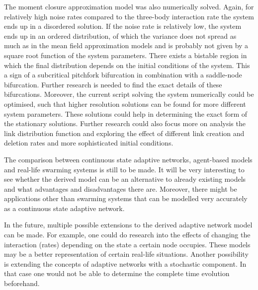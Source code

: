 The moment closure approximation model was also numerically solved. Again, for relatively high noise rates compared to the three-body interaction rate the system ends up in a disordered solution. If the noise rate is relatively low, the system ends up in an ordered distribution, of which the variance does not spread as much as in the mean field approximation models and is probably not given by a square root function of the system parameters. There exists a bistable region in which the final distribution depends on the initial conditions of the system. This a sign of a subcritical pitchfork bifurcation in combination with a saddle-node bifurcation. Further research is needed to find the exact details of these bifurcations. Moreover, the current script solving the system numerically could be optimised, such that higher resolution solutions can be found for more different system parameters. These solutions could help in determining the exact form of the stationary solutions. Further research could also focus more on analysis the link distribution function and exploring the effect of different link creation and deletion rates and more sophisticated initial conditions. 

The comparison between continuous state adaptive networks, agent-based models and real-life swarming systems is still to be made. It will be very interesting to see whether the derived model can be an alternative to already existing models and what advantages and disadvantages there are. Moreover, there might be applications other than swarming systems that can be modelled very accurately as a continuous state adaptive network.

In the future, multiple possible extensions to the derived adaptive network model can be made. For example, one could do research into the effects of changing the interaction (rates) depending on the state a certain node occupies. These models may be a better representation of certain real-life situations. Another possibility is extending the concepts of adaptive networks with a stochastic component. In that case one would not be able to determine the complete time evolution beforehand.





